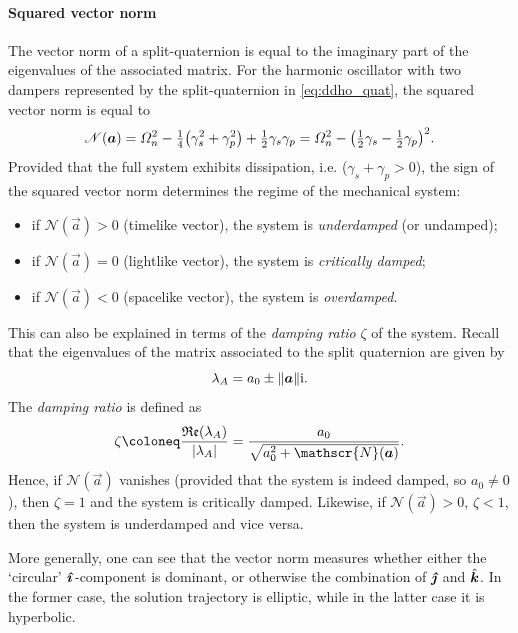\paragraph{Squared vector norm}
The vector norm of a split-quaternion is equal to the imaginary part of the eigenvalues of the associated matrix. For the harmonic oscillator with two dampers represented by the split-quaternion in \cref{eq:ddho_quat}, the squared vector norm is equal to 
\begin{equation}
    \mathscr{N}(\vec{a}) = \Omega^2_n - \tfrac{1}{4}\qty(\gamma_s^2 + \gamma_p^2) + \tfrac{1}{2}\gamma_s \gamma_p = \Omega^2_n - \qty(\tfrac{1}{2}\gamma_s - \tfrac{1}{2}\gamma_p)^2.
\end{equation}
Provided that the full system exhibits dissipation, i.e. (\(\gamma_s + \gamma_p > 0\)), the sign of the squared vector norm determines the regime of the mechanical system:
\begin{itemize}
    \item if \(\mathscr{N}(\vec{a}) > 0\) (timelike vector), the system is \emph{underdamped} (or undamped); 
    \item if \(\mathscr{N}(\vec{a}) = 0\) (lightlike vector), the system is \emph{critically damped}; 
    \item if \(\mathscr{N}(\vec{a}) < 0\) (spacelike vector), the system is \emph{overdamped}.
\end{itemize}
This can also be explained in terms of the \emph{damping ratio} \(\zeta\) of the system. Recall that the eigenvalues of the matrix associated to the split quaternion are given by
\begin{equation}
    \lambda_A = a_0 \pm \norm{\vec{a}}\ii.
\end{equation}
The \emph{damping ratio} is defined as
\begin{equation}
    \zeta \coloneq \frac{\Re(\lambda_A)}{\abs{\lambda_A}} = \frac{a_0}{\sqrt{a_0^2 + \mathscr{N}(\vec{a})}}.
\end{equation}
Hence, if \(\mathscr{N}(\vec{a})\) vanishes (provided that the system is indeed damped, so \(a_0 \neq 0\)), then \(\zeta = 1\) and the system is critically damped. Likewise, if \(\mathscr{N}(\vec{a}) > 0\), \(\zeta < 1\), then the system is underdamped and vice versa.

More generally, one can see that the vector norm measures whether either the `circular' \(\quati\)-component is dominant, or otherwise the combination of \(\quatj\) and \(\quatk\). In the former case, the solution trajectory is elliptic, while in the latter case it is hyperbolic.

